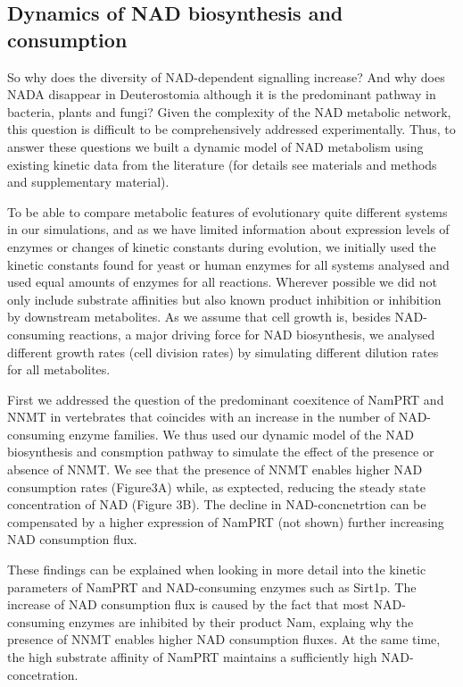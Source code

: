 \subsection{Dynamics of NAD biosynthesis and consumption}

So why does the diversity of NAD-dependent signalling increase? And why does NADA disappear in Deuterostomia although it is the predominant pathway in bacteria, plants and fungi? Given the complexity of the NAD metabolic network, this question is difficult to be comprehensively addressed experimentally. Thus, to answer these questions we built a dynamic model of NAD metabolism using existing kinetic data from the literature (for details see materials and methods and supplementary material).

To be able to compare metabolic features of evolutionary quite different systems in our simulations, and as we have limited information about expression levels of enzymes or changes of kinetic constants during evolution, we initially used the kinetic constants found for yeast or human enzymes for all systems analysed and used equal amounts of enzymes for all reactions. Wherever possible we did not only include substrate affinities but also known product inhibition or inhibition by downstream metabolites. As we assume that cell growth is, besides NAD-consuming reactions, a major driving force for NAD biosynthesis, we analysed different growth rates (cell division rates) by simulating different dilution rates for all metabolites.

First we addressed the question of the predominant coexitence of NamPRT and NNMT in vertebrates that coincides with an increase in the number of NAD-consuming enzyme families. We thus used our dynamic model of the NAD biosynthesis and consmption pathway to simulate the effect of the  presence or absence of NNMT.  We see that the presence of NNMT enables higher NAD consumption rates  (Figure3A) while, as exptected, reducing the steady state concentration of NAD (Figure 3B). The decline in NAD-concnetrtion can be compensated by a higher expression of NamPRT (not shown) further increasing NAD consumption flux.

These findings can be explained when looking in more detail into the kinetic parameters of NamPRT and NAD-consuming enzymes such as Sirt1p.  The increase of NAD consumption flux is caused by the fact that most NAD-consuming enzymes are inhibited by their product Nam, explaing why the presence of NNMT enables higher NAD consumption fluxes. At the same time, the high substrate affinity of NamPRT maintains a sufficiently high NAD-concetration.


